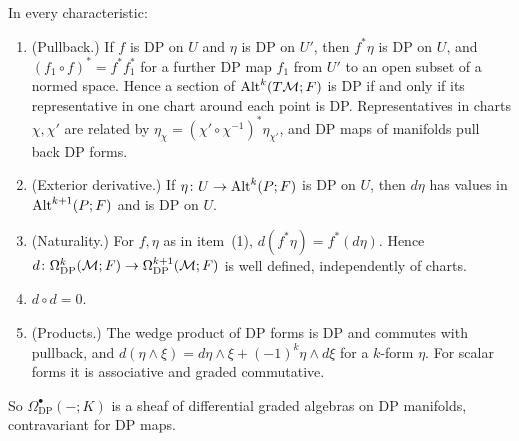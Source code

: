 \begin{theorem}\label{dp:thm:de-rham}
In every characteristic:
\begin{enumerate}
\item \textup{(Pullback.)} If $f$ is DP on $U$ and $\eta$ is DP on $U'$, then $f^*\eta$ is DP on $U$, and $(f_1\circ f)^*=f^*f_1^*$ for a further DP map $f_1$ from $U'$ to an open subset of a normed space. Hence a section of $\operatorname{Alt}^k(T\mathcal M;F)$ is DP if and only if its representative in one chart around each point is DP. Representatives in charts $\chi,\chi'$ are related by $\eta_\chi=(\chi'\circ\chi^{-1})^*\eta_{\chi'}$, and DP maps of manifolds pull back DP forms.
\item \textup{(Exterior derivative.)} If $\eta\colon U\to\operatorname{Alt}^k(P;F)$ is DP on $U$, then $d\eta$ has values in $\operatorname{Alt}^{k+1}(P;F)$ and is DP on $U$.
\item \textup{(Naturality.)} For $f,\eta$ as in item~\textup{(1)}, $d(f^*\eta)=f^*(d\eta)$. Hence $d\colon\Omega^k_{\mathrm{DP}}(\mathcal M;F)\to\Omega^{k+1}_{\mathrm{DP}}(\mathcal M;F)$ is well defined, independently of charts.
\item $d\circ d=0$.
\item \textup{(Products.)} The wedge product of DP forms is DP and commutes with pullback, and $d(\eta\wedge\xi)=d\eta\wedge\xi+(-1)^k\eta\wedge d\xi$ for a $k$-form $\eta$. For scalar forms it is associative and graded commutative.
\end{enumerate}
So $\Omega^\bullet_{\mathrm{DP}}(-;K)$ is a sheaf of differential graded algebras on DP manifolds, contravariant for DP maps.
\end{theorem}

